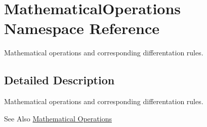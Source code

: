 \hypertarget{namespaceMathematicalOperations}{\section{Mathematical\-Operations Namespace Reference}
\label{namespaceMathematicalOperations}
}


Mathematical operations and corresponding differentation rules.  




\subsection{Detailed Description}
Mathematical operations and corresponding differentation rules. \begin{DoxySeeAlso}{See Also}
\hyperlink{group__MathematicalOperationsGroup}{Mathematical Operations} 
\end{DoxySeeAlso}

